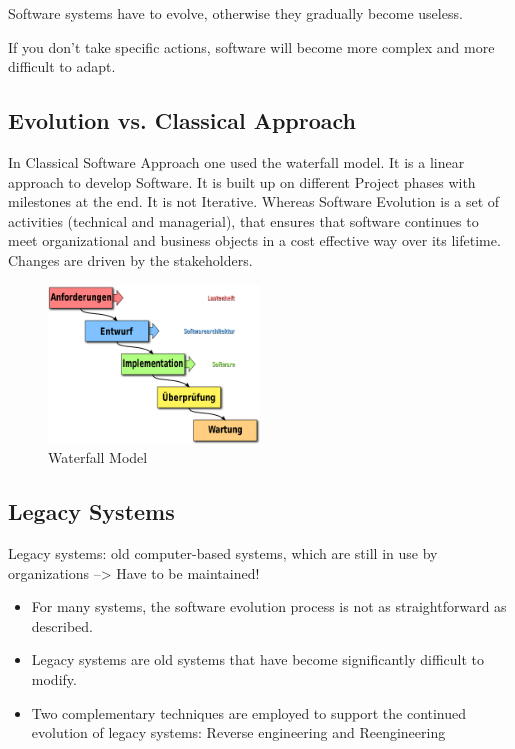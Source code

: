 \begin{tcolorbox}[colback=red!5!white,colframe=red!75!black]
Software systems have to evolve, otherwise they gradually become useless.

If you don’t take specific actions, software will become more complex and more difficult to adapt.
\end{tcolorbox}


\subsection{Evolution vs. Classical Approach}
In Classical Software Approach one used the waterfall model. It is a linear approach to develop Software. It is built up on different Project phases with milestones at the end. It is not Iterative. Whereas Software Evolution is a set of activities (technical and managerial), that ensures that software continues to meet organizational and business objects in a cost effective way over its lifetime. Changes are driven by the stakeholders.
\begin{figure}[H]
\centering
\includegraphics[width=0.5\textwidth]{figures/Waterfall.png}
\caption{Waterfall Model}
\end{figure}

\hypertarget{legacy-systems}{%
\subsection{Legacy Systems}\label{legacy-systems}}






\begin{tcolorbox}[colback=red!5!white,colframe=red!75!black]
Legacy systems: old computer-based systems, which are still in use by organizations
--> Have to be maintained!
\end{tcolorbox}

\begin{itemize}
\tightlist
\item
  For many systems, the software evolution process is not as
  straightforward as described.
\item
  Legacy systems are old systems that have become significantly
  difficult to modify.
\item
  Two complementary techniques are employed to support the continued
  evolution of legacy systems: Reverse engineering and Reengineering
\end{itemize}

\clearpage
